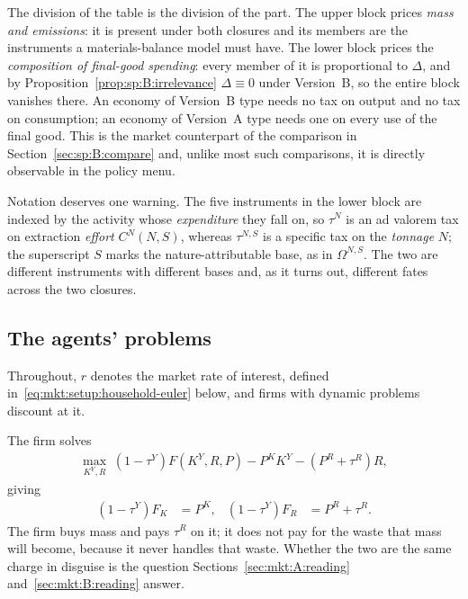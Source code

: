 The division of the table is the division of the part. The upper block prices \emph{mass and
emissions}: it is present under both closures and its members are the instruments a materials-balance
model must have. The lower block prices the \emph{composition of final-good spending}: every member of
it is proportional to $\Delta$, and by Proposition~\ref{prop:sp:B:irrelevance} $\Delta\equiv0$ under
Version~B, so the entire block vanishes there. An economy of Version~B type needs no tax on output and
no tax on consumption; an economy of Version~A type needs one on every use of the final good. This is
the market counterpart of the comparison in Section~\ref{sec:sp:B:compare} and, unlike most such
comparisons, it is directly observable in the policy menu.

Notation deserves one warning. The five instruments in the lower block are indexed by the activity
whose \emph{expenditure} they fall on, so $\tau^N$ is an ad valorem tax on extraction \emph{effort}
$C^N(N,S)$, whereas $\tau^{N,S}$ is a specific tax on the \emph{tonnage} $N$; the superscript $S$
marks the nature-attributable base, as in $\Omega^{N,S}$. The two are different instruments with
different bases and, as it turns out, different fates across the two closures.


\subsection{The agents' problems}\label{sec:mkt:setup:problems}

Throughout, $r$ denotes the market rate of interest, defined in~\eqref{eq:mkt:setup:household-euler}
below, and firms with dynamic problems discount at it.

 The firm solves
\begin{align}
\max_{K^Y,R}\;\left(1-\tau^Y\right)F\left(K^Y,R,P\right)-P^KK^Y-\left(P^R+\tau^R\right)R,
\label{eq:mkt:setup:goodsfirm}
\end{align}
giving
\begin{align}
\left(1-\tau^Y\right)F_K &= P^K,
&
\left(1-\tau^Y\right)F_R &= P^R+\tau^R .
\label{eq:mkt:setup:foc:goodsfirm}
\end{align}
The firm buys mass and pays $\tau^R$ on it; it does not pay for the waste that mass will become,
because it never handles that waste. Whether the two are the same charge in disguise is the question
Sections~\ref{sec:mkt:A:reading} and~\ref{sec:mkt:B:reading} answer.

